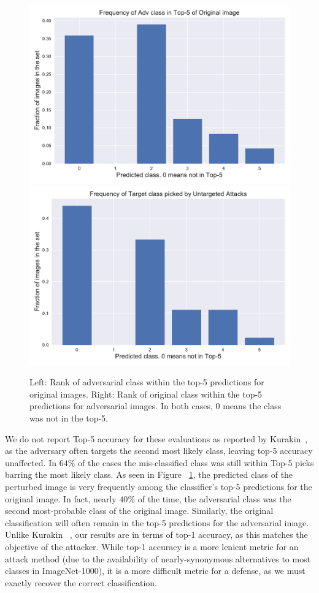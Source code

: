 \begin{figure}[H]
\centering
   \includegraphics[width=0.49\linewidth]{figures/pixel/untargeted.pdf}
   \includegraphics[width=0.49\linewidth]{figures/pixel/retargeted.pdf}
   \caption[Overlap of Classes under Adversary]{Left: Rank of adversarial class within the top-5 predictions for original images.  Right: Rank of original class within the top-5 predictions for adversarial images.  In both cases, 0 means the class was not in the top-5.}
   \label{fig:untarget}
\end{figure}
We do not report Top-5 accuracy for these evaluations as reported by Kurakin\etal ~\cite{Kurakin2016AdversarialEI}, as the adversary often targets the second most likely class, leaving top-5 accuracy unaffected.
In $64\%$ of the cases the mis-classified class was still within Top-5 picks barring the most likely class. 
As seen in Figure ~\ref{fig:untarget}, the predicted class of the perturbed image is very frequently among the classifier's top-5 predictions for the original image.
In fact, nearly $40\%$ of the time, the adversarial class was the second most-probable class of the original image.
Similarly, the original classification will often remain in the top-5 predictions for the adversarial image.
Unlike Kurakin \etal ~\cite{Kurakin2016AdversarialEI}, our results are in terms of top-1 accuracy, as this matches the objective of the attacker.
While top-1 accuracy is a more lenient metric for an attack method (due to the availability of nearly-synonymous alternatives to most classes in ImageNet-1000), it is a more difficult metric for a defense, as we must exactly recover the correct classification.
